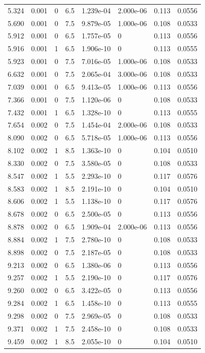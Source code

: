 \documentclass[preview]{standalone}
\begin{document}
{{\begin{tabular}{L{1.2cm}C{1.2cm} C{0.3cm}C{0.5cm} C{1.4cm}C{1.4cm} C{1.4cm}C{1.4cm}}
  5.324  &  0.001  & 0     & 6.5 &  1.239e-04  & 2.000e-06  & 0.113 &  0.0556   \\ 
  5.690  &  0.001  & 0     & 7.5 &  9.879e-05  & 1.000e-06  & 0.108 &  0.0533   \\ 
  5.912  &  0.001  & 0     & 6.5 &  1.757e-05  & 0  & 0.113 &  0.0556   \\ 
  5.916  &  0.001  & 1     & 6.5 &  1.906e-10  & 0  & 0.113 &  0.0555   \\ 
  5.923  &  0.001  & 0     & 7.5 &  7.016e-05  & 1.000e-06  & 0.108 &  0.0533   \\ 
  6.632  &  0.001  & 0     & 7.5 &  2.065e-04  & 3.000e-06  & 0.108 &  0.0533   \\ 
  7.039  &  0.001  & 0     & 6.5 &  9.413e-05  & 1.000e-06  & 0.113 &  0.0556   \\ 
  7.366  &  0.001  & 0     & 7.5 &  1.120e-06  & 0  & 0.108 &  0.0533   \\ 
  7.432  &  0.001  & 1     & 6.5 &  1.328e-10  & 0  & 0.113 &  0.0555   \\ 
  7.654  &  0.002  & 0     & 7.5 &  1.454e-04  & 2.000e-06  & 0.108 &  0.0533   \\ 
  8.090  &  0.002  & 0     & 6.5 &  5.718e-05  & 1.000e-06  & 0.113 &  0.0556   \\ 
  8.102  &  0.002  & 1     & 8.5 &  1.363e-10  & 0  & 0.104 &  0.0510   \\ 
  8.330  &  0.002  & 0     & 7.5 &  3.580e-05  & 0  & 0.108 &  0.0533   \\ 
  8.547  &  0.002  & 1     & 5.5 &  2.293e-10  & 0  & 0.117 &  0.0576   \\ 
  8.583  &  0.002  & 1     & 8.5 &  2.191e-10  & 0  & 0.104 &  0.0510   \\ 
  8.606  &  0.002  & 1     & 5.5 &  1.138e-10  & 0  & 0.117 &  0.0576   \\ 
  8.678  &  0.002  & 0     & 6.5 &  2.500e-05  & 0  & 0.113 &  0.0556   \\ 
  8.878  &  0.002  & 0     & 6.5 &  1.909e-04  & 2.000e-06  & 0.113 &  0.0556   \\ 
  8.884  &  0.002  & 1     & 7.5 &  2.780e-10  & 0  & 0.108 &  0.0533   \\ 
  8.898  &  0.002  & 0     & 7.5 &  2.187e-05  & 0  & 0.108 &  0.0533   \\ 
  9.213  &  0.002  & 0     & 6.5 &  1.380e-06  & 0  & 0.113 &  0.0556   \\ 
  9.257  &  0.002  & 1     & 5.5 &  2.190e-10  & 0  & 0.117 &  0.0576   \\ 
  9.260  &  0.002  & 0     & 6.5 &  3.422e-05  & 0  & 0.113 &  0.0556   \\ 
  9.284  &  0.002  & 1     & 6.5 &  1.458e-10  & 0  & 0.113 &  0.0555   \\ 
  9.298  &  0.002  & 0     & 7.5 &  2.969e-05  & 0  & 0.108 &  0.0533   \\ 
  9.371  &  0.002  & 1     & 7.5 &  2.458e-10  & 0  & 0.108 &  0.0533   \\ 
  9.459  &  0.002  & 1     & 8.5 &  2.055e-10  & 0  & 0.104 &  0.0510   \\ 
\hline 
\end{tabular} 

}}
\end{document}
